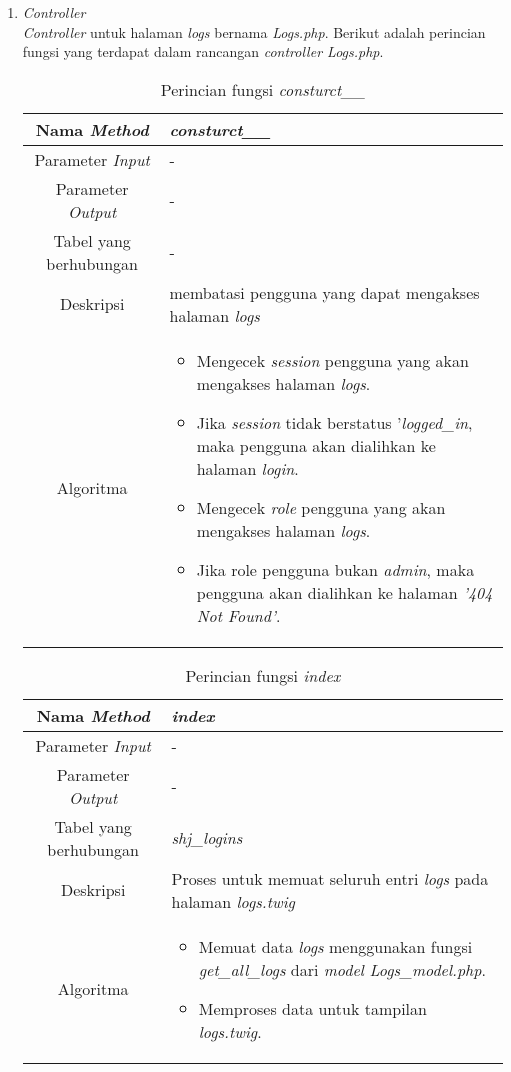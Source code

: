 \begin{enumerate}
	\item \textit{Controller} \\
	\textit{Controller} untuk halaman \textit{logs} bernama \textit{Logs.php}. Berikut adalah perincian fungsi yang terdapat dalam rancangan \textit{controller Logs.php}.
	\begin{table}[H]
		\caption{Perincian fungsi \textit{consturct\_\_}}
		\begin{tabular}{|c|p{11cm}|}
			\hline
			Nama \textit{Method} 	& 	\textit{consturct\_\_} 	\\
			\hline
			Parameter \textit{Input} & - \\
			\hline
			Parameter \textit{Output} &  - \\
			\hline
			Tabel yang berhubungan & - \\
			\hline
			Deskripsi	& membatasi pengguna yang dapat mengakses halaman \textit{logs}	 \\
			\hline
			Algoritma	& \begin{itemize}
				\item Mengecek \textit{session} pengguna yang akan mengakses halaman \textit{logs}.
				\item Jika \textit{session} tidak berstatus '\textit{logged\_in}, maka pengguna akan dialihkan ke halaman \textit{login}.
				\item Mengecek \textit{role} pengguna yang akan mengakses halaman \textit{logs}.
				\item Jika role pengguna bukan \textit{admin}, maka pengguna akan dialihkan ke halaman \textit{'404 Not Found'}.
			\end{itemize} \\
			\hline
		\end{tabular}
	\end{table}
	
	\begin{table}[H]
		\caption{Perincian fungsi \textit{index}}
		\begin{tabular}{|c|p{11cm}|}
			\hline
			Nama \textit{Method} 	& 	\textit{index} 	\\
			\hline
			Parameter \textit{Input} & - \\
			\hline
			Parameter \textit{Output} &  - \\
			\hline
			Tabel yang berhubungan & \textit{shj\_logins} \\
			\hline
			Deskripsi	& Proses untuk memuat seluruh entri \textit{logs} pada halaman \textit{logs.twig}	 \\
			\hline
			Algoritma	& \begin{itemize}
				\item Memuat data \textit{logs} menggunakan fungsi \textit{get\_all\_logs} dari \textit{model Logs\_model.php}.
				\item Memproses data untuk tampilan \textit{logs.twig}.
			\end{itemize} \\
			\hline
		\end{tabular}
	\end{table}
\end{enumerate}

